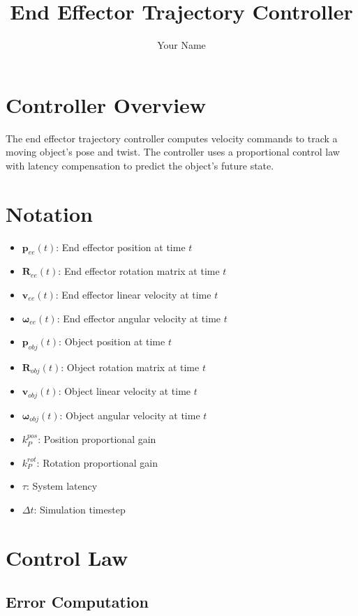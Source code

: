 \documentclass{article}
\title{End Effector Trajectory Controller}
\author{Your Name}
\begin{document}
\maketitle

\section{Controller Overview}

The end effector trajectory controller computes velocity commands to track a moving object's pose and twist. The controller uses a proportional control law with latency compensation to predict the object's future state.

\section{Notation}

\begin{itemize}
    \item $\bm{p}_{ee}(t)$: End effector position at time $t$
    \item $\bm{R}_{ee}(t)$: End effector rotation matrix at time $t$
    \item $\bm{v}_{ee}(t)$: End effector linear velocity at time $t$
    \item $\bm{\omega}_{ee}(t)$: End effector angular velocity at time $t$
    \item $\bm{p}_{obj}(t)$: Object position at time $t$
    \item $\bm{R}_{obj}(t)$: Object rotation matrix at time $t$
    \item $\bm{v}_{obj}(t)$: Object linear velocity at time $t$
    \item $\bm{\omega}_{obj}(t)$: Object angular velocity at time $t$
    \item $k_P^{pos}$: Position proportional gain
    \item $k_P^{rot}$: Rotation proportional gain
    \item $\tau$: System latency
    \item $\Delta t$: Simulation timestep
\end{itemize}

\section{Control Law}

\subsection{Error Computation}
\end{document}
